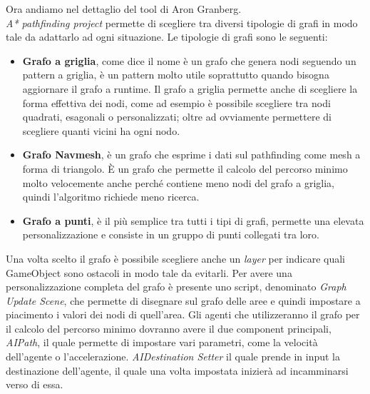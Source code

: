 \documentclass[12pt, openany]{book}
\begin{document}
		Ora andiamo nel dettaglio del tool di Aron Granberg. \\
		\emph{A* pathfinding project} permette di scegliere tra diversi tipologie di grafi in modo tale da adattarlo ad ogni situazione. Le tipologie di grafi sono le seguenti:
		\begin{itemize}
			\item \textbf{Grafo a griglia}, come dice il nome è un grafo che genera nodi seguendo un pattern a griglia, è un pattern molto utile soprattutto quando bisogna aggiornare il grafo a runtime. Il grafo a griglia permette anche di scegliere la forma effettiva dei nodi, come ad esempio è possibile scegliere tra nodi quadrati, esagonali o personalizzati; oltre ad ovviamente permettere di scegliere quanti vicini ha ogni nodo.
			\item \textbf{Grafo Navmesh}, è un grafo che esprime i dati sul pathfinding come mesh a forma di triangolo. È un grafo che permette il calcolo del percorso minimo molto velocemente anche perché contiene meno nodi del grafo a griglia, quindi l'algoritmo richiede meno ricerca.
			\item \textbf{Grafo a punti}, è il più semplice tra tutti i tipi di grafi, permette una elevata personalizzazione e consiste in un gruppo di punti collegati tra loro.
		\end{itemize}
	Una volta scelto il grafo è possibile scegliere anche un \emph{layer} per indicare quali GameObject sono ostacoli in modo tale da evitarli.
	Per avere una personalizzazione completa del grafo è presente uno script, denominato \emph{Graph Update Scene}, che permette di disegnare sul grafo delle aree e quindi impostare a piacimento i valori dei nodi di quell'area.
	Gli agenti che utilizzeranno il grafo per il calcolo del percorso minimo dovranno avere il due component principali, \emph{AIPath}, il quale permette di impostare vari parametri, come la velocità dell'agente o l'accelerazione. \emph{AIDestination Setter} il quale prende in input la destinazione dell'agente, il quale una volta impostata inizierà ad incamminarsi verso di essa. 
	
\end{document}
